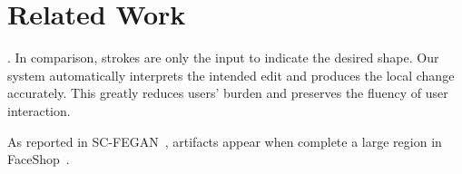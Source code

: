 \section{Related Work}





. In comparison, strokes are only the input to indicate the desired shape. Our system automatically interprets the intended edit and produces the local change accurately. This greatly reduces users' burden and preserves the fluency of user interaction. 

 As reported in SC-FEGAN~\cite{}, artifacts appear when complete a large region in FaceShop~\cite{}.
